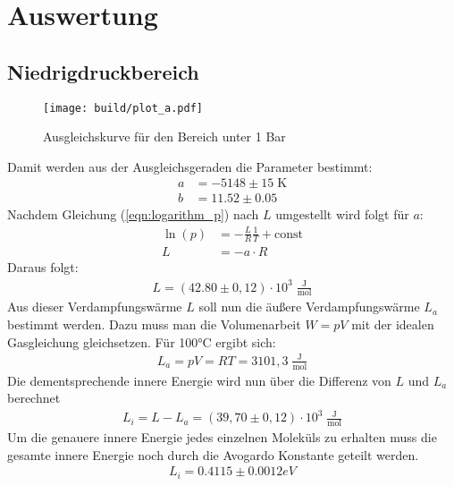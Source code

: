 \section{Auswertung}
\label{sec:Auswertung}
\subsection{Niedrigdruckbereich}
\begin{figure}
    \centering
    \texttt{[image: build/plot\_a.pdf]}
    \caption{Ausgleichskurve für den Bereich unter 1 Bar}
    \label{fig:Niedrigdruck}
\end{figure}
Damit werden aus der Ausgleichsgeraden die Parameter bestimmt:
\begin{align*}
    a &= -5148 \pm 15 \; \text{K}\\
    b &= 11.52 \pm 0.05
\end{align*}
Nachdem Gleichung (\ref{eqn:logarithm_p}) nach $L$ umgestellt wird folgt für $a$:
\begin{align*}
    \ln(p) &= -\frac{L}{R}\frac{1}{T}+\text{const} \\ L &= -a\cdot R
\end{align*}
Daraus folgt:
\begin{align*}
    L = (42.80\pm 0,12)\cdot 10^3 \; \frac{\text{J}}{\text{mol}}
\end{align*}
Aus dieser Verdampfungswärme $L$ soll nun die äußere Verdampfungswärme $L_a$ bestimmt werden.
Dazu muss man die Volumenarbeit $W = pV$ mit der idealen Gasgleichung gleichsetzen.
Für 100°C ergibt sich:
\begin{align*}
    L_a = pV = RT = 3101,3 \; \frac{\text{J}}{\text{mol}}
\end{align*}
Die dementsprechende innere Energie wird nun über die Differenz von $L$ und $L_a$ berechnet
\begin{align*}
    L_i = L - L_a = (39,70\pm0,12)\cdot 10^3 \; \frac{\text{J}}{\text{mol}}
\end{align*}
Um die genauere innere Energie jedes einzelnen Moleküls zu erhalten muss die gesamte innere Energie noch durch die Avogardo Konstante geteilt werden.
\begin{align*}
    L_i = 0.4115\pm 0.0012 eV
\end{align*}
